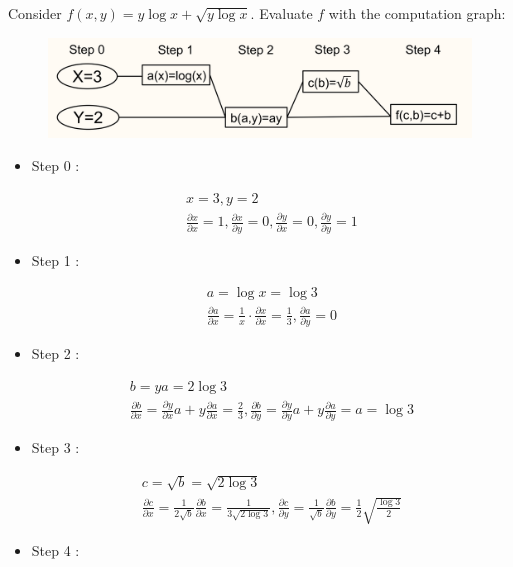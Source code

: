 \documentclass{report}
\begin{document}
\begin{example}
    Consider $f(x, y)=y \log x+\sqrt{y \log x}$. Evaluate $f$ with the computation graph:

    \begin{figure}[H]
        \centering
        \includegraphics[width=1.0\textwidth]{.././assets/6.11.png}
    \end{figure}

    \begin{itemize}
        \item
        Step 0 :

        $$
        \begin{gathered}
        x=3, y=2 \\
        \frac{\partial x}{\partial x}=1, \frac{\partial x}{\partial y}=0, \frac{\partial y}{\partial x}=0, \frac{\partial y}{\partial y}=1
        \end{gathered}
        $$
        \item
        Step 1 :

        $$
        \begin{gathered}
        a=\log x=\log 3 \\
        \frac{\partial a}{\partial x}=\frac{1}{x} \cdot \frac{\partial x}{\partial x}=\frac{1}{3}, \frac{\partial a}{\partial y}=0
        \end{gathered}
        $$
        \item
        Step 2 :

        $$
        \begin{gathered}
        b=y a=2 \log 3 \\
        \frac{\partial b}{\partial x}=\frac{\partial y}{\partial x} a+y \frac{\partial a}{\partial x}=\frac{2}{3}, \frac{\partial b}{\partial y}=\frac{\partial y}{\partial y} a+y \frac{\partial a}{\partial y}=a=\log 3
        \end{gathered}
        $$
        \item
        Step 3 :

        $$
        \begin{gathered}
        c=\sqrt{b}=\sqrt{2 \log 3} \\
        \frac{\partial c}{\partial x}=\frac{1}{2 \sqrt{b}} \frac{\partial b}{\partial x}=\frac{1}{3 \sqrt{2 \log 3}}, \frac{\partial c}{\partial y}=\frac{1}{\sqrt{b}} \frac{\partial b}{\partial y}=\frac{1}{2} \sqrt{\frac{\log 3}{2}}
        \end{gathered}
        $$
        \item
        Step 4 :


\end{itemize}
\end{example}
\end{document}
